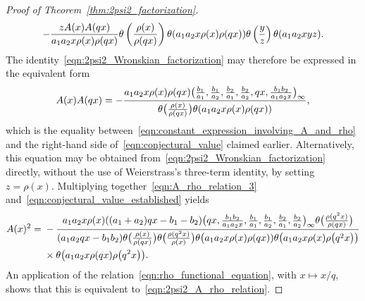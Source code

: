 \documentclass[pdftex]{sigma}
\numberwithin{equation}{section}
\begin{document}
\begin{proof}[Proof of Theorem~\ref{thm:2psi2_factorization}]
\[ -{z A(x) A(qx) \over a_1a_2x \rho(x)\rho(qx)} \theta\left({\rho(x) \over \rho(qx)}\right) \theta (a_1a_2x\rho(x)\rho(qx) ) \theta\left({y \over z} \right) \theta(a_1a_2xyz). \]
The identity~\eqref{eqn:2psi2_Wronskian_factorization} may therefore be expressed in the equivalent form
\begin{equation} \label{eqn:conjectural_value_established}
A(x) A(qx) = -{a_1a_2x\rho(x)\rho(qx)\bigl({b_1 \over a_1},{b_1 \over a_2},{b_2 \over a_1},{b_2 \over a_2},qx,{b_1b_2 \over a_1a_2x}\bigr)_{ \infty} \over \theta\bigl({\rho(x) \over \rho(qx)}\bigr) \theta(a_1a_2x\rho(x)\rho(qx))},
\end{equation}
which is the equality between~\eqref{eqn:constant_expression_involving_A_and_rho} and the right-hand side of~\eqref{eqn:conjectural_value} claimed earlier. Alternatively, this equation may be obtained from~\eqref{eqn:2psi2_Wronskian_factorization} directly, without the use of Weierstrass's three-term identity, by setting $z=\rho(x)$. Multiplying together~\eqref{eqn:A_rho_relation_3} and~\eqref{eqn:conjectural_value_established} yields{\samepage
\begin{align*}
A(x)^2 ={}& -{a_1a_2x \rho(x) ((a_1+a_2)qx-b_1-b_2 ) \bigl(qx,{b_1b_2 \over a_1a_2x},{b_1 \over a_1},{b_1 \over a_2},{b_2 \over a_1},{b_2 \over a_2}\bigr)_\infty \theta\bigl( {\rho(q^2x) \over \rho(qx)} \bigr) \over (a_1a_2qx-b_1b_2) \theta\bigl({\rho(x) \over \rho(qx)}\bigr) \theta\bigl({\rho(q^2x) \over \rho(x)}\bigr) \theta\bigl(a_1a_2x\rho(x)\rho(qx) ) \theta \bigl(a_1a_2x\rho(x)\rho\bigl(q^2x\bigr) \bigr)} \\
& \times \theta\bigl( a_1a_2x\rho(qx)\rho\bigl(q^2x\bigr)\bigr).
\end{align*}
An application of the relation~\eqref{eqn:rho_functional_equation}, with $x \mapsto x/q$, shows that this is equivalent to~\eqref{eqn:2psi2_A_rho_relation}.}


\end{proof}
\end{document}
